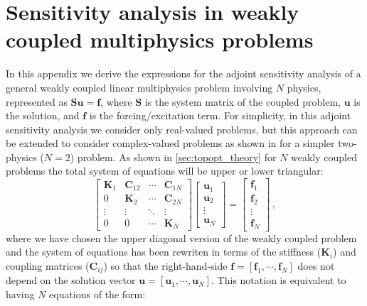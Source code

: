 \section{Sensitivity analysis in weakly coupled multiphysics problems}\label{app:appendix1}
In this appendix we derive the expressions for the adjoint sensitivity analysis of a general weakly coupled linear multiphysics problem involving $N$ physics, represented as $\mathbf{S}\mathbf{u}=\mathbf{f}$, where $\mathbf{S}$ is the system matrix of the coupled problem, $\mathbf{u}$ is the solution, and $\mathbf{f}$ is the forcing/excitation term. For simplicity, in this adjoint sensitivity analysis we consider
only real-valued problems, but this approach can be extended to consider complex-valued problems
as shown in \cite{ownpub0} for a simpler two-physics ($N=2$) problem.
As shown in \autoref{sec:topopt_theory} for $N$ weakly coupled problems the total system of equations will be upper or lower triangular:
\begin{equation} \label{eq:multiphysics_weak}
    \begin{bmatrix}
        \mathbf{K}_1 & \mathbf{C}_{12} & \cdots & \mathbf{C}_{1N} \\
        0 & \mathbf{K}_2 & \cdots & \mathbf{C}_{2N} \\
        \vdots & \vdots & \ddots & \vdots\\
        0 & 0 & \cdots & \mathbf{K}_N
    \end{bmatrix}
    \begin{bmatrix}
        \mathbf{u}_1\\
        \mathbf{u}_2\\
        \vdots\\
        \mathbf{u}_N
    \end{bmatrix}
    =
    \begin{bmatrix}
        \mathbf{f}_1\\
        \mathbf{f}_2\\
        \vdots\\
        \mathbf{f}_N
    \end{bmatrix}\,,
\end{equation}
where we have chosen the upper diagonal version of the weakly coupled problem and the system of equations has been rewriten in terms of the stiffness ($\mathbf{K}_i$) and 
coupling matrices ($\mathbf{C}_{ij}$) so that the right-hand-side $\mathbf{f}=[\mathbf{f}_1, \cdots, \mathbf{f}_N]$ does not depend
on the solution vector $\mathbf{u}=[\mathbf{u}_1, \cdots, \mathbf{u}_N]$. This notation is equivalent to having $N$ equations of the form:
